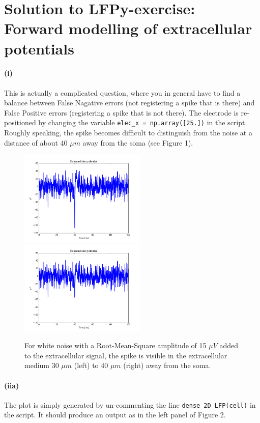 \documentclass[a4paper,12pt]{article}
\begin{document}
\section*{Solution to LFPy-exercise:\\Forward modelling of extracellular potentials}

\paragraph{(i)} This is actually a complicated question, where you in general have to find a balance between False Nagative errors (not registering a spike that is there) and False Positive errors (registering a spike that is not there). The electrode is re-positioned by changing the variable \texttt{elec\_x = np.array([25.])} in the script.  Roughly speaking, the spike becomes difficult to distinguish from the noise at a distance of about 40 $\mu m$ away from the soma (see Figure 1).

\begin{figure}[hb]
\centering
\includegraphics[width=6cm]{spike_30um}
\includegraphics[width=6cm]{spike_40um}
\caption{For white noise with a Root-Mean-Square amplitude of 15 $\mu V$ added to the extracellular signal,
the spike is visible in the extracellular medium 30 $\mu m$ (left) to 40 $\mu m$ (right) away from the soma.}
\end{figure}

\paragraph{(iia)} The plot is simply generated by un-commenting the line \texttt{dense\_2D\_LFP(cell)} in the script. It should produce an output as in the left panel of Figure 2.
\end{document}
